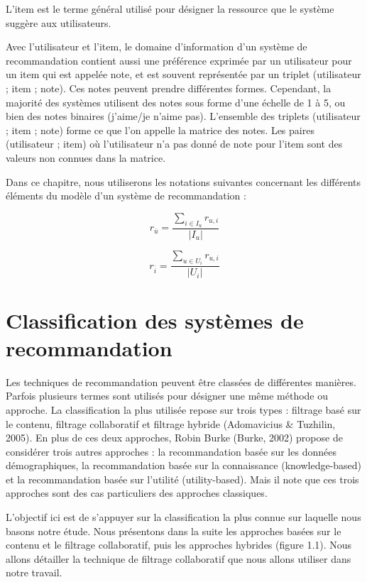 L’item est le terme général utilisé pour désigner la ressource que le système suggère aux
utilisateurs.

Avec l’utilisateur et l’item, le domaine d’information d’un système de recommandation contient
aussi une préférence exprimée par un utilisateur pour un item qui est appelée note, et est souvent
représentée par un triplet (utilisateur ; item ; note). Ces notes peuvent prendre différentes formes.
Cependant, la majorité des systèmes utilisent des notes sous forme d’une échelle de 1 à 5, ou bien
des notes binaires (j’aime/je n’aime pas). L’ensemble des triplets (utilisateur ; item ; note) forme
ce que l’on appelle la matrice des notes. Les paires (utilisateur ; item) où l’utilisateur n’a pas donné
de note pour l’item sont des valeurs non connues dans la matrice.

Dans ce chapitre, nous utiliserons les notations suivantes concernant les différents éléments du
modèle d’un système de recommandation :


\[
r_{\overline{u}} = \frac{\sum_{i \in I_u} r_{u,i}}{|I_u|}
\tag{1.1}
\]

\[
r_{\overline{i}} = \frac{\sum_{u \in U_i} r_{u,i}}{|U_i|}
\tag{1.2}
\]
\section{Classification des systèmes de recommandation}

Les techniques de recommandation peuvent être classées de différentes manières. Parfois
plusieurs termes sont utilisés pour désigner une même méthode ou approche. La classification la
plus utilisée repose sur trois types : filtrage basé sur le contenu, filtrage collaboratif et filtrage
hybride (Adomavicius \& Tuzhilin, 2005). En plus de ces deux approches, Robin Burke
(Burke, 2002) propose de considérer trois autres approches : la recommandation basée sur les
données démographiques, la recommandation basée sur la connaissance (knowledge-based) et la
recommandation basée sur l'utilité (utility-based). Mais il note que ces trois approches sont des cas
particuliers des approches classiques.

L'objectif ici est de s'appuyer sur la classification la plus connue sur laquelle nous basons notre
étude. Nous présentons dans la suite les approches basées sur le contenu et le filtrage collaboratif, puis
les approches hybrides (figure 1.1). Nous allons détailler la technique de filtrage collaboratif que
nous allons utiliser dans notre travail.

